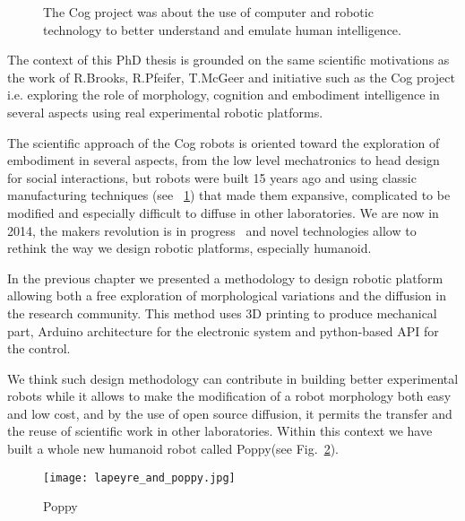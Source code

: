 

\begin{figure}[t]
\centering
    \hfil
    \caption{The Cog project was about the use of computer and robotic technology to better understand and emulate human intelligence.}
    \label{fig:cog_project}
\end{figure}



The context of this PhD thesis is grounded on the same scientific motivations as the work of R.Brooks, R.Pfeifer, T.McGeer and initiative such as the Cog project i.e. exploring the role of morphology, cognition and embodiment intelligence in several aspects using real experimental robotic platforms.

The scientific approach of the Cog robots is oriented toward the exploration of embodiment in several aspects, from the low level mechatronics to head design for social interactions, but robots were built 15 years ago and using classic manufacturing techniques (see \figurename~\ref{fig:cog_project}) that made them expansive, complicated to be modified and especially difficult to diffuse in other laboratories.
We are now in 2014, the makers revolution is in progress~\cite{anderson} and novel technologies allow to rethink the way we design robotic platforms, especially humanoid.

In the previous chapter we presented a methodology to design robotic platform allowing both a free exploration of morphological variations and the diffusion in the research community. This method uses 3D printing to produce mechanical part, Arduino architecture for the electronic system and python-based API for the control.

We think such design methodology can contribute in building better experimental robots while it allows to make the modification of a robot morphology both easy and low cost, and by the use of open source diffusion, it permits the transfer and the reuse of scientific work in other laboratories.
Within this context we have built a whole new humanoid robot called Poppy\texttrademark (see Fig.~\ref{fig:poppy_with_me}).

\begin{figure}[tb]
    \begin{center}
        \texttt{[image: lapeyre\_and\_poppy.jpg]}
    \end{center}
    \caption{Poppy}
    \label{fig:poppy_with_me}
\end{figure}

